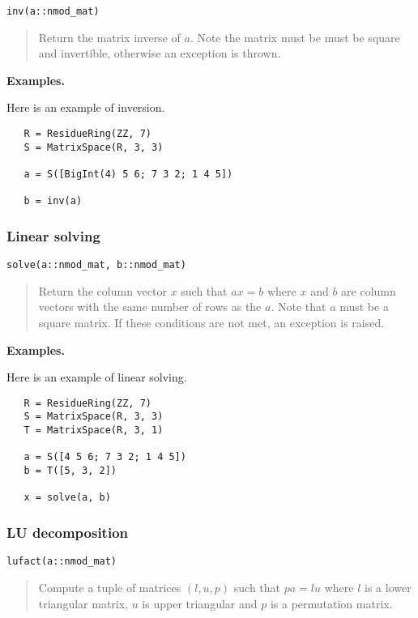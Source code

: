 \documentclass[a4paper,10pt]{article}
\newcommand{\desc}[1]{\vspace{-3mm}\begin{quote}#1\end{quote}}
\begin{document}
{{\begin{lstlisting}
inv(a::nmod_mat)
\end{lstlisting}

\desc{Return the matrix inverse of $a$. Note the matrix must be must be square and
invertible, otherwise an exception is thrown.}

\textbf{Examples.}

Here is an example of inversion.

\begin{lstlisting}
   R = ResidueRing(ZZ, 7)
   S = MatrixSpace(R, 3, 3)

   a = S([BigInt(4) 5 6; 7 3 2; 1 4 5])

   b = inv(a)
\end{lstlisting}

\subsubsection{Linear solving}

\begin{lstlisting}
solve(a::nmod_mat, b::nmod_mat)
\end{lstlisting}

\desc{Return the column vector $x$ such that $ax = b$ where $x$ and $b$ are column
vectors with the same number of rows as the $a$. Note that $a$ must be a square
matrix. If these conditions are not met, an exception is raised.}

\textbf{Examples.}

Here is an example of linear solving.

\begin{lstlisting}
   R = ResidueRing(ZZ, 7)
   S = MatrixSpace(R, 3, 3)
   T = MatrixSpace(R, 3, 1)

   a = S([4 5 6; 7 3 2; 1 4 5])
   b = T([5, 3, 2])

   x = solve(a, b)
\end{lstlisting}

\subsubsection{LU decomposition}

\begin{lstlisting}
lufact(a::nmod_mat)
\end{lstlisting}

\desc{Compute a tuple of matrices $(l, u, p)$ such that $pa = lu$ where $l$ is a
lower triangular matrix, $u$ is upper triangular and $p$ is a permutation matrix.}

}}
\end{document}
